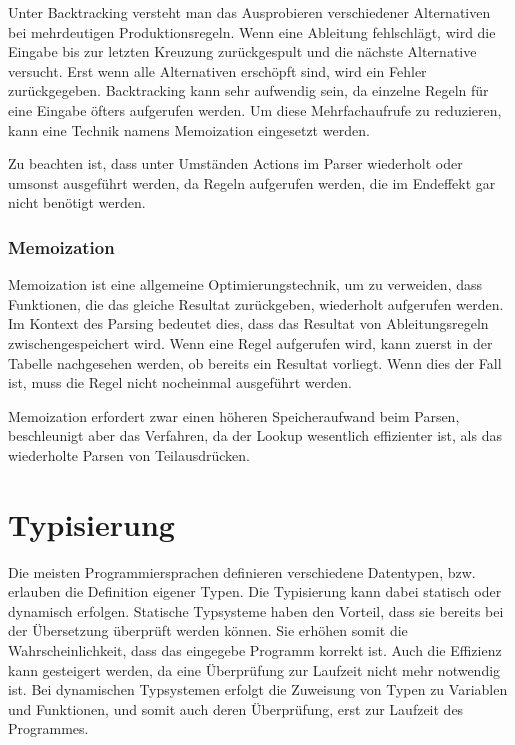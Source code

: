 Unter Backtracking versteht man das Ausprobieren verschiedener Alternativen bei mehrdeutigen Produktionsregeln. Wenn eine Ableitung fehlschlägt, wird die Eingabe bis zur letzten Kreuzung zurückgespult und die nächste Alternative versucht. Erst wenn alle Alternativen erschöpft sind, wird ein Fehler zurückgegeben. Backtracking kann sehr aufwendig sein, da einzelne Regeln für eine Eingabe öfters aufgerufen werden. Um diese Mehrfachaufrufe zu reduzieren, kann eine Technik namens Memoization eingesetzt werden.

Zu beachten ist, dass unter Umständen Actions im Parser wiederholt oder umsonst ausgeführt werden, da Regeln aufgerufen werden, die im Endeffekt gar nicht benötigt werden.

\subsubsection{Memoization}

Memoization ist eine allgemeine Optimierungstechnik, um zu verweiden, dass Funktionen, die das gleiche Resultat zurückgeben,  wiederholt aufgerufen werden. Im Kontext des Parsing bedeutet dies, dass das Resultat von Ab\-lei\-tungs\-re\-geln zwischengespeichert wird. Wenn eine Regel aufgerufen wird, kann zuerst in der Tabelle nachgesehen werden, ob bereits ein Resultat vorliegt. Wenn dies der Fall ist, muss die Regel nicht nocheinmal ausgeführt werden.

Memoization erfordert zwar einen höheren Speicheraufwand beim Parsen, beschleunigt aber das Verfahren, da der Lookup wesentlich effizienter ist, als das wiederholte Parsen von Teilausdrücken.

\section{Typisierung}

Die meisten Programmiersprachen definieren verschiedene Datentypen, bzw. erlauben die Definition eigener Typen. Die Typisierung kann dabei statisch oder dynamisch erfolgen. Statische Typsysteme haben den Vorteil, dass sie bereits bei der Übersetzung überprüft werden können. Sie erhöhen somit die Wahrscheinlichkeit, dass das eingegebe Programm korrekt ist. Auch die Effizienz kann gesteigert werden, da eine Überprüfung zur Laufzeit nicht mehr not\-wen\-dig ist. Bei dynamischen Typsystemen erfolgt die Zuweisung von Typen zu Variablen und Funktionen, und somit auch deren Überprüfung, erst zur Laufzeit des Programmes.

